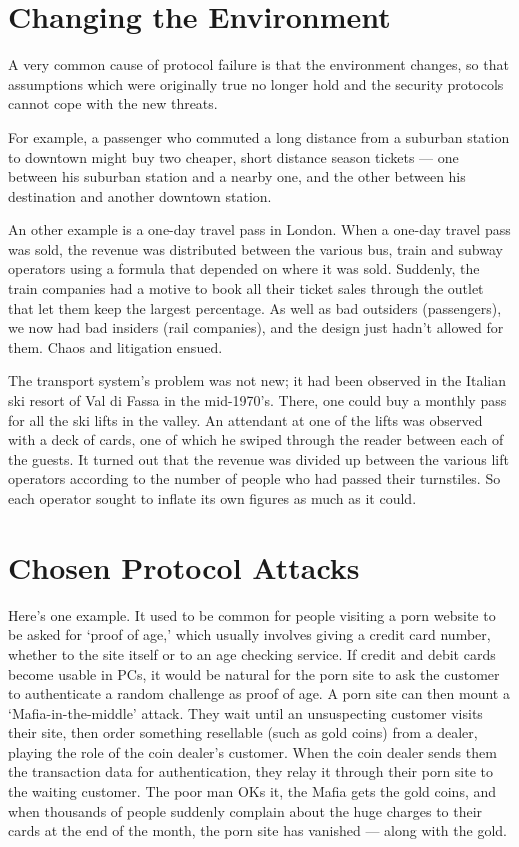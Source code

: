 	
\section{Changing the Environment}

	A very common cause of protocol failure is that the environment changes, so
	that assumptions which were originally true no longer hold and the security
	protocols cannot cope with the new threats.

	For example, a passenger who commuted a long distance from a suburban station 
	to downtown might buy two cheaper, short distance season tickets — one between 
	his suburban station and a nearby one, and the other between his destination 
	and another downtown station. 

	An other example is a one-day travel pass in London.
	When a one-day travel pass was sold, the revenue was distributed between 
	the various bus, train and subway operators using a formula that depended on where it 
	was sold. Suddenly, the train companies had a motive to book all their ticket sales 
	through the outlet that let them keep the largest percentage. As well as bad outsiders
	(passengers), we now had bad insiders (rail companies), and the design just
	hadn’t allowed for them. Chaos and litigation ensued.

	The transport system’s problem was not new; it had been observed in the
	Italian ski resort of Val di Fassa in the mid-1970’s. There, one could buy a
	monthly pass for all the ski lifts in the valley. An attendant at one of the lifts
	was observed with a deck of cards, one of which he swiped through the reader
	between each of the guests. It turned out that the revenue was divided up
	between the various lift operators according to the number of people who had
	passed their turnstiles. So each operator sought to inflate its own figures as
	much as it could.


\section{Chosen Protocol Attacks}
	Here’s one example. It used to be common for people visiting a porn
	website to be asked for ‘proof of age,’ which usually involves giving a
	credit card number, whether to the site itself or to an age checking service.
	If credit and debit cards become usable in PCs, it would be natural for
	the porn site to ask the customer to authenticate a random challenge as
	proof of age. A porn site can then mount a ‘Mafia-in-the-middle’ attack. 
	They wait until an unsuspecting customer visits their site,
	then order something resellable (such as gold coins) from a dealer, playing
	the role of the coin dealer’s customer. When the coin dealer sends them the
	transaction data for authentication, they relay it through their porn site to
	the waiting customer. The poor man OKs it, the Mafia gets the gold coins, and
	when thousands of people suddenly complain about the huge charges to their
	cards at the end of the month, the porn site has vanished — along with the
	gold. 


